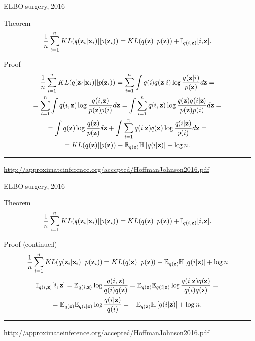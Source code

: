 \documentclass{beamer}
\begin{document}
\begin{frame}{ELBO surgery, 2016}
\begin{block}{Theorem}
\[
    \frac{1}{n} \sum_{i=1}^n KL(q(\mathbf{z}_i | \mathbf{x}_i) || p(\mathbf{z}_i)) = KL(q(\mathbf{z}) || p(\mathbf{z})) + \mathbb{I}_{q(i, \mathbf{z})} [i, \mathbf{z}].
\]
\end{block}
\begin{block}{Proof}
\vspace{-0.3cm}
{\footnotesize
\begin{multline*}
    \frac{1}{n} \sum_{i=1}^n KL(q(\mathbf{z}_i | \mathbf{x}_i) || p(\mathbf{z}_i)) = \sum_{i=1}^n \int q(i) q(\mathbf{z} | i) \log \frac{q(\mathbf{z} | i)}{p(\mathbf{z})} d \mathbf{z} = \\
    = \sum_{i=1}^n \int q(i, \mathbf{z}) \log \frac{q(i, \mathbf{z})}{p(\mathbf{z})p(i)} d \mathbf{z} =
    \int \sum_{i=1}^n q(i, \mathbf{z}) \log \frac{ q (\mathbf{z}) q(i | \mathbf{z}) }{p(\mathbf{z}) p(i) } d \mathbf{z} = \\
    = \int q(\mathbf{z}) \log \frac{q(\mathbf{z})}{p(\mathbf{z})} d\mathbf{z} + \int \sum_{i=1}^n q(i | \mathbf{z}) q(\mathbf{z}) \log \frac{q(i | \mathbf{z})}{p(i)} d \mathbf{z} = \\
    = KL (q(\mathbf{z}) || p(\mathbf{z})) - \mathbb{E}_{q(\mathbf{z})} \mathbb{H} \left[q(i | \mathbf{z})  \right] + \log n.
\end{multline*}
}
\end{block}
\vfill
\hrule\medskip
{\scriptsize \href{http://approximateinference.org/accepted/HoffmanJohnson2016.pdf}{http://approximateinference.org/accepted/HoffmanJohnson2016.pdf}}
\end{frame}
\begin{frame}{ELBO surgery, 2016}
\begin{block}{Theorem}
\[
    \frac{1}{n} \sum_{i=1}^n KL(q(\mathbf{z}_i | \mathbf{x}_i) || p(\mathbf{z}_i)) = KL(q(\mathbf{z}) || p(\mathbf{z})) + \mathbb{I}_{q(i, \mathbf{z})} [i, \mathbf{z}].
\]
\end{block}
\begin{block}{Proof (continued)}
{\footnotesize
\[
    \frac{1}{n} \sum_{i=1}^n KL(q(\mathbf{z}_i | \mathbf{x}_i) || p(\mathbf{z}_i)) = KL (q(\mathbf{z}) || p(\mathbf{z})) - \mathbb{E}_{q(\mathbf{z})} \mathbb{H} \left[q(i | \mathbf{z}) \right] + \log n
\]
\begin{multline*}
    \mathbb{I}_{q(i, \mathbf{z})} [i, \mathbf{z}] = \mathbb{E}_{q(i, \mathbf{z})} \log \frac{q(i, \mathbf{z})}{q(i)q(\mathbf{z})} = \mathbb{E}_{q(\mathbf{z})} \mathbb{E}_{q(i | \mathbf{z})} \log \frac{q(i | \mathbf{z}) q(\mathbf{z})}{q(i)q(\mathbf{z})} = \\
    = \mathbb{E}_{q(\mathbf{z})} \mathbb{E}_{q(i | \mathbf{z})} \log \frac{q(i | \mathbf{z})}{q(i)} = - \mathbb{E}_{q(\mathbf{z})} \mathbb{H} \left[ q(i | \mathbf{z}) \right] + \log n.
\end{multline*}
}
\end{block}
\vfill
\hrule\medskip
{\scriptsize \href{http://approximateinference.org/accepted/HoffmanJohnson2016.pdf}{http://approximateinference.org/accepted/HoffmanJohnson2016.pdf}}
\end{frame}
\end{document}
